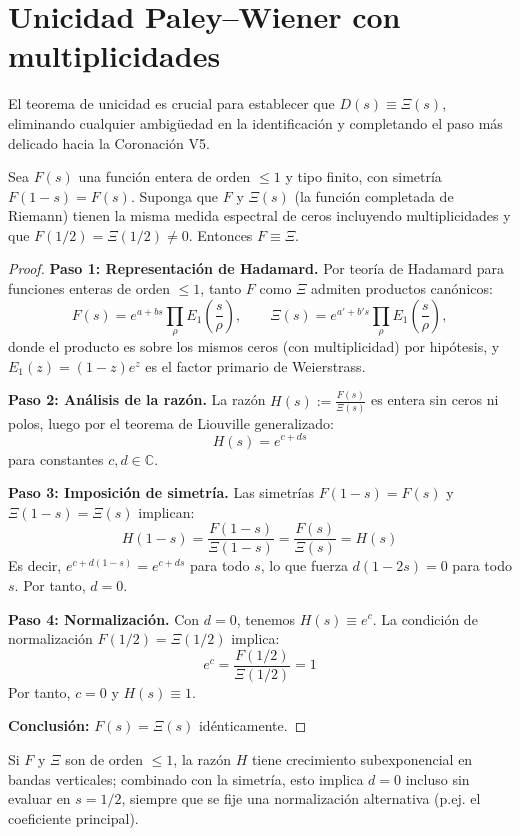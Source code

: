 \section{Unicidad Paley--Wiener con multiplicidades}\label{sec:unicidad}

El teorema de unicidad es crucial para establecer que $D(s) \equiv \Xi(s)$, eliminando cualquier ambigüedad en la identificación y completando el paso más delicado hacia la Coronación V5.

\begin{theorem}\label{thm:unicidad-principal}
Sea $F(s)$ una función entera de orden $\leq 1$ y tipo finito, con simetría $F(1-s)=F(s)$.
Suponga que $F$ y $\Xi(s)$ (la función completada de Riemann) tienen la misma medida
espectral de ceros incluyendo multiplicidades y que $F(1/2)=\Xi(1/2)\neq 0$.
Entonces $F\equiv \Xi$.
\end{theorem}

\begin{proof}
\textbf{Paso 1: Representación de Hadamard.}
Por teoría de Hadamard para funciones enteras de orden $\leq 1$, tanto $F$ como $\Xi$
admiten productos canónicos:
\[
F(s)=e^{a+bs}\prod_\rho E_1\!\left(\frac{s}{\rho}\right),\qquad
\Xi(s)=e^{a'+b's}\prod_\rho E_1\!\left(\frac{s}{\rho}\right),
\]
donde el producto es sobre los mismos ceros (con multiplicidad) por hipótesis,
y $E_1(z)=(1-z)e^{z}$ es el factor primario de Weierstrass.

\textbf{Paso 2: Análisis de la razón.}
La razón $H(s):=\frac{F(s)}{\Xi(s)}$ es entera sin ceros ni polos, luego por el teorema de Liouville generalizado:
\[
H(s)=e^{c+ds}
\]
para constantes $c, d \in \mathbb{C}$.

\textbf{Paso 3: Imposición de simetría.}
Las simetrías $F(1-s)=F(s)$ y $\Xi(1-s)=\Xi(s)$ implican:
\[
H(1-s)=\frac{F(1-s)}{\Xi(1-s)}=\frac{F(s)}{\Xi(s)}=H(s)
\]
Es decir, $e^{c+d(1-s)}=e^{c+ds}$ para todo $s$, lo que fuerza $d(1-2s)=0$ para todo $s$.
Por tanto, $d=0$.

\textbf{Paso 4: Normalización.}
Con $d=0$, tenemos $H(s)\equiv e^c$. La condición de normalización $F(1/2)=\Xi(1/2)$ implica:
\[
e^c = \frac{F(1/2)}{\Xi(1/2)} = 1
\]
Por tanto, $c=0$ y $H(s)\equiv 1$.

\textbf{Conclusión:} $F(s) = \Xi(s)$ idénticamente.
\end{proof}

\begin{lemma}\label{lem:control-crecimiento}
Si $F$ y $\Xi$ son de orden $\leq 1$, la razón $H$ tiene crecimiento subexponencial en bandas verticales; combinado con la simetría, esto implica $d=0$ incluso sin evaluar en $s=1/2$, siempre que se fije una normalización alternativa (p.ej. el coeficiente principal).
\end{lemma}

